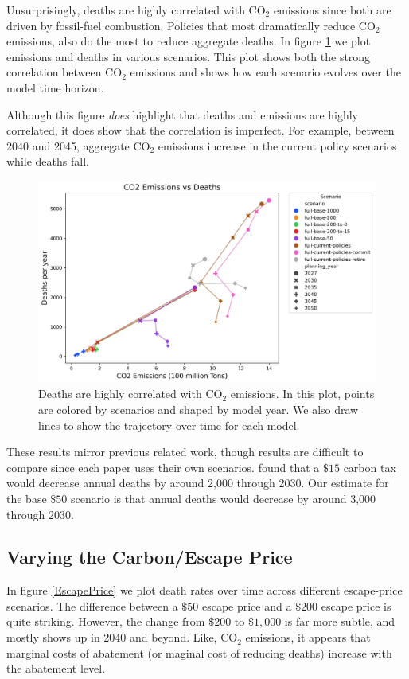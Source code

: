 \documentclass[a4paper]{article}
\theoremstyle{definition}
\theoremstyle{plain}
\begin{document}
Unsurprisingly, deaths are highly correlated with CO$_2$ emissions since both are driven by fossil-fuel combustion.  Policies that most dramatically reduce CO$_2$ emissions, also do the most to reduce aggregate deaths.  In figure \ref{DeathsEmissions} we plot emissions and deaths in various scenarios.  This plot shows both the strong correlation between CO$_2$ emissions and shows how each scenario evolves over the model time horizon.  

Although this figure \textit{ does} highlight that deaths and emissions are highly correlated, it does show that the correlation is imperfect.  For example, between 2040 and 2045, aggregate CO$_2$ emissions increase in the current policy scenarios while deaths fall.

\begin{figure}
    \centering
    \includegraphics[width=1\linewidth]{Figures/Output/Deaths_vs_Emissions_withlines_GenX.png}
    \caption{Deaths are highly correlated with CO$_2$ emissions.  In this plot, points are colored by scenarios and shaped by model year.  We also draw lines to show the trajectory over time for each model.}
    \label{DeathsEmissions}
\end{figure}



These results mirror previous related work, though results are difficult to compare since each paper uses their own scenarios. 
 \citet{Shawhan2024PoliciesAmericans} found that a $\$15$ carbon tax would decrease annual deaths by around 2,000 through 2030.  Our estimate for the base $\$50$ scenario is that annual deaths would decrease by around 3,000 through 2030. 

\subsection{Varying the Carbon/Escape Price}
In figure \ref{EscapePrice} we plot death rates over time across different escape-price scenarios.  The difference between a $\$50$ escape price and a $\$200$ escape price is quite striking.  However, the change from $\$200$ to $\$1,000$ is far more subtle, and mostly shows up in 2040 and beyond.  Like, CO$_2$ emissions, it appears that marginal costs of abatement (or maginal cost of reducing deaths) increase with the abatement level.
\end{document}
